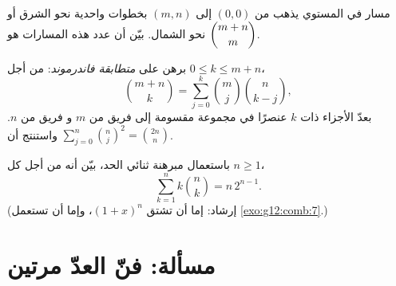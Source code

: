 \begin{exercise}[$\star\star$]\label{exo:g12:comb:8}
مسار في المستوي يذهب من $(0,0)$ إلى $(m, n)$ بخطوات واحدية نحو الشرق أو
نحو الشمال. بيّن أن عدد هذه المسارات هو $\dbinom{m+n}{m}$.
\end{exercise}

\begin{exercise}[$\star\star\star$]\label{exo:g12:comb:9}
برهن على \emph{متطابقة فاندرموند}: من أجل $0 \leq k \leq m + n$،
\[
\binom{m+n}{k} = \sum_{j=0}^{k} \binom{m}{j}\binom{n}{k-j},
\]
بعدّ الأجزاء ذات $k$ عنصرًا في مجموعة مقسومة إلى فريق من $m$ و
فريق من $n$. واستنتج أن
$\displaystyle\sum_{j=0}^{n}\binom{n}{j}^{\!2} = \binom{2n}{n}$.
\end{exercise}

\begin{exercise}[$\star\star\star$]\label{exo:g12:comb:10}
باستعمال مبرهنة ثنائي الحد، بيّن أنه من أجل كل $n \geq 1$،
\[
\sum_{k=1}^{n} k \binom{n}{k} = n\,2^{n-1}.
\]
(إرشاد: إما أن تشتق $(1+x)^n$، وإما أن تستعمل \cref{exo:g12:comb:7}.)
\end{exercise}

\section{مسألة: فنّ العدّ مرتين}

